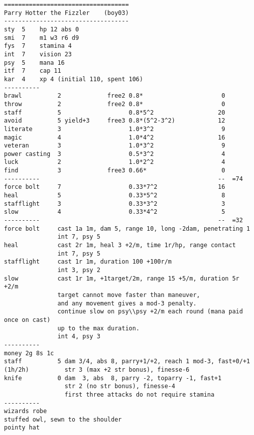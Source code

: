 \pagebreak[1]
\tiny \begin{samepage} \begin{verbatim}
===================================
Parry Hotter the Fizzler    (boy03)
-----------------------------------
sty  5    hp 12 abs 0
smi  7    m1 w3 r6 d9
fys  7    stamina 4
int  7    vision 23
psy  5    mana 16
itf  7    cap 11
kar  4    xp 4 (initial 110, spent 106)
----------
brawl          2             free2 0.8*                      0
throw          2             free2 0.8*                      0
staff          5                   0.8*5^2                  20
avoid          5 yield+3     free3 0.8*(5^2-3^2)            12
literate       3                   1.0*3^2                   9
magic          4                   1.0*4^2                  16
veteran        3                   1.0*3^2                   9
power casting  3                   0.5*3^2                   4
luck           2                   1.0*2^2                   4
find           3             free3 0.66*                     0
----------                                                  --  =74
force bolt     7                   0.33*7^2                 16
heal           5                   0.33*5^2                  8
stafflight     3                   0.33*3^2                  3
slow           4                   0.33*4^2                  5
----------                                                  --  =32
force bolt     cast 1a 1m, dam 5, range 10, long -2dam, penetrating 1
               int 7, psy 5
heal           cast 2r 1m, heal 3 +2/m, time 1r/hp, range contact
               int 7, psy 5
stafflight     cast 1r 1m, duration 100 +100r/m
               int 3, psy 2
slow           cast 1r 1m, +1target/2m, range 15 +5/m, duration 5r +2/m
               target cannot move faster than maneuver,
               and any movement gives a mod-3 penalty.
               continue slow on psy\\psy +2/m each round (mana paid once on cast)
               up to the max duration.
               int 4, psy 3
----------
money 2g 8s 1c
staff          5 dam 3/4, abs 8, parry+1/+2, reach 1 mod-3, fast+0/+1
(1h/2h)          str 3 (max +2 str bonus), finesse-6
knife          0 dam  3, abs  8, parry -2, toparry -1, fast+1
                 str 2 (no str bonus), finesse-4
                 first three attacks do not require stamina
----------
wizards robe
stuffed owl, sewn to the shoulder
pointy hat
\end{verbatim} \end{samepage} \normalsize


